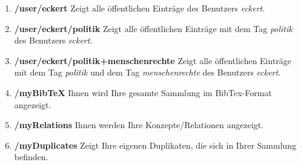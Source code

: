 \begin{enumerate}
    \item \textbf{/user/eckert} \newline
    Zeigt alle öffentlichen Einträge des Benutzers \textit{eckert}.
    \item \textbf{/user/eckert/politik} \newline
    Zeigt alle öffentlichen Einträge mit dem Tag \textit{politik} des Benutzers \textit{eckert}.
    \item \textbf{/user/eckert/politik+menschenrechte} \newline
    Zeigt alle öffentlichen Einträge mit dem Tag \textit{politik} und dem Tag \textit{menschenrechte} des Benutzers \textit{eckert}.
     \item \textbf{/myBibTeX} \newline
    Ihnen wird Ihre gesamte Sammlung im BibTex-Format angezeigt.
    \item \textbf{/myRelations} \newline
    Ihnen werden Ihre Konzepte/Relationen angezeigt.
    \item \textbf{/myDuplicates} \newline
    Zeigt Ihre eigenen Duplikaten, die sich in Ihrer Sammlung befinden.
\end{enumerate}
    

